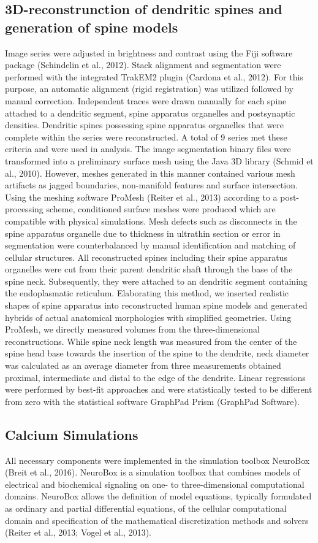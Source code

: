 \documentclass[fleqn,10pt]{wlscirep}
\begin{document}
\subsection*{3D-reconstrunction of dendritic spines and generation of spine models} Image series were adjusted in brightness and contrast using the Fiji software package (Schindelin et al., 2012). Stack alignment and segmentation were performed with the integrated TrakEM2 plugin (Cardona et al., 2012). For this purpose, an automatic alignment (rigid registration) was utilized followed by manual correction. Independent traces were drawn manually for each spine attached to a dendritic segment, spine apparatus organelles and postsynaptic densities. Dendritic spines possessing spine apparatus organelles that were complete within the series were reconstructed. A total of 9 series met these criteria and were used in analysis. The image segmentation binary files were transformed into a preliminary surface mesh using the Java 3D library (Schmid et al., 2010). However, meshes generated in this manner contained various mesh artifacts as jagged boundaries, non-manifold features and surface intersection. Using the meshing software ProMesh (Reiter et al., 2013) according to a post-processing scheme, conditioned surface meshes were produced which are compatible with physical simulations. Mesh defects such as disconnects in the spine apparatus organelle due to thickness in ultrathin section or error in segmentation were counterbalanced by manual identification and matching of cellular structures. All reconstructed spines including their spine apparatus organelles were cut from their parent dendritic shaft through the base of the spine neck. Subsequently, they were attached to an dendritic segment containing the endoplasmatic reticulum. Elaborating this method, we inserted realistic shapes of spine apparatus into reconstructed human spine models and generated hybrids of actual anatomical morphologies with simplified geometries. Using ProMesh, we directly measured volumes from the three-dimensional reconstructions. While spine neck length was measured from the center of the spine head base towards the insertion of the spine to the dendrite, neck diameter was calculated as an average diameter from three measurements obtained proximal, intermediate and distal to the edge of the dendrite. Linear regressions were performed by best-fit approaches and were statistically tested to be different from zero with the statistical software GraphPad Prism (GraphPad Software).
\subsection*{Calcium Simulations} All necessary components were implemented in the simulation toolbox NeuroBox (Breit et al., 2016). NeuroBox is a simulation toolbox that combines models of electrical and biochemical signaling on one- to three-dimensional computational domains. NeuroBox allows the definition of model equations, typically formulated as ordinary and partial differential equations, of the cellular computational domain and specification of the mathematical discretization methods and solvers (Reiter et al., 2013; Vogel et al., 2013). 
\end{document}
